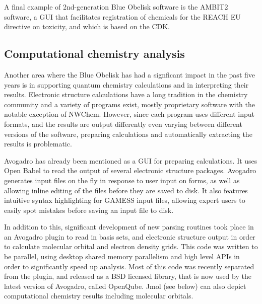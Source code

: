 \documentclass[10pt]{bmc_article}
\newenvironment{bmcformat}{\fussy\setboolean{publ}{true}}{\fussy}
\begin{document}
\begin{bmcformat}
A final example of 2nd-generation Blue Obelisk software is the 
AMBIT2~\cite{WebAMBIT} software, a GUI that facilitates registration
of chemicals for the REACH EU directive on toxicity, and which is
based on the CDK.

\subsection*{Computational chemistry analysis}

Another area where the Blue Obelisk has had a signficant impact in the
past five years is in supporting
quantum chemistry calculations and in interpreting their results.
Electronic structure calculations have a long tradition in the
chemistry community and a variety of programs exist, mostly
proprietary software with the notable exception of NWChem.\cite{NWChem}
However, since each program uses different input formats, and the
results are output differently even varying between different versions
of the software, preparing calculations and automatically extracting
the results is problematic. 

Avogadro has already been mentioned as a GUI for preparing calculations.
It uses Open Babel to read the output of several electronic structure
packages. Avogadro generates input files on the fly in response to user
input on forms, as well as allowing inline editing of the files before
they are saved to disk. It also features intuitive syntax highlighting
for GAMESS input files, allowing expert users to easily spot mistakes
before saving an input file to disk.

In addition to this, significant development of new parsing routines took
place in an Avogadro plugin to read in basis sets, and electronic structure
output in order to calculate molecular orbital and electron density grids.
This code was written to be parallel, using desktop shared memory parallelism
and high level APIs in order to significantly speed up analysis. Most of this
code was recently separated from the plugin, and released as a BSD licensed
library, that is now used by the latest version of Avogadro, called OpenQube.
Jmol (see below)
can also depict computational chemistry results including molecular orbitals.


\end{bmcformat}
\end{document}
